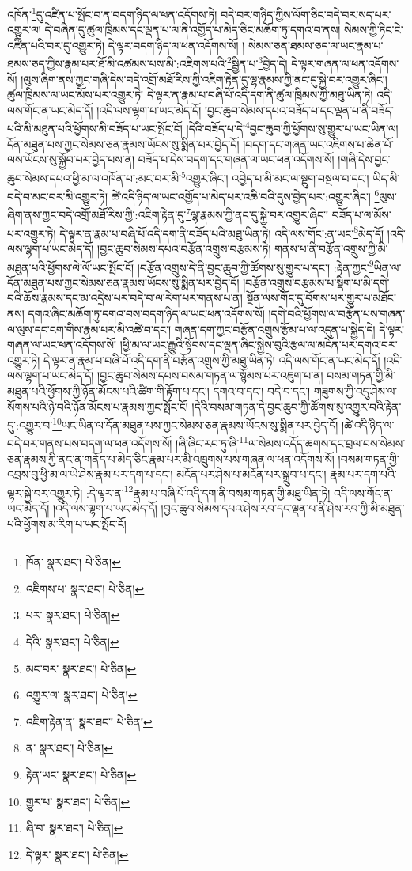 འཁོན་\footnote{ཁོན་  སྣར་ཐང་།  པེ་ཅིན། }དུ་འཛིན་པ་སྤོང་བ་ན་བདག་ཉིད་ལ་ཕན་འདོགས་ཏེ། བདེ་བར་གཉིད་ཀྱིས་ལོག་ཅིང་བདེ་བར་སད་པར་འགྱུར་ལ། དེ་བཞིན་དུ་ཚུལ་ཁྲིམས་དང་ལྡན་པ་ལ་ནི་འགྱོད་པ་མེད་ཅིང་མཆོག་ཏུ་དགའ་བ་ནས། སེམས་ཀྱི་ཏིང་ངེ་འཛིན་པའི་བར་དུ་འགྱུར་ཏེ། དེ་ལྟར་བདག་ཉིད་ལ་ཕན་འདོགས་སོ། །
སེམས་ཅན་ཐམས་ཅད་ལ་ཡང་རྣམ་པ་ཐམས་ཅད་ཀྱིས་རྣམ་པར་ཐོ་མི་འཚམས་པས་མི་:འཇིགས་པའི་\footnote{འཇིགས་པ་  སྣར་ཐང་།  པེ་ཅིན། }སྦྱིན་པ་\footnote{པར་  སྣར་ཐང་།  པེ་ཅིན། }བྱེད་དེ། དེ་ལྟར་གཞན་ལ་ཕན་འདོགས་སོ། །ལུས་ཞིག་ནས་ཀྱང་གཞི་དེས་བདེ་འགྲོ་མཐོ་རིས་ཀྱི་འཇིག་རྟེན་དུ་ལྷ་རྣམས་ཀྱི་ནང་དུ་སྐྱེ་བར་འགྱུར་ཞིང་། ཚུལ་ཁྲིམས་ལ་ཡང་མོས་པར་འགྱུར་ཏེ། དེ་ལྟར་ན་རྣམ་པ་བཞི་པོ་འདི་དག་ནི་ཚུལ་ཁྲིམས་ཀྱི་མཐུ་ཡིན་ཏེ། འདི་ལས་གོང་ན་ཡང་མེད་དོ། །འདི་ལས་ལྷག་པ་ཡང་མེད་དོ། །བྱང་ཆུབ་སེམས་དཔའ་བཟོད་པ་དང་ལྡན་པ་ནི་བཟོད་པའི་མི་མཐུན་པའི་ཕྱོགས་མི་བཟོད་པ་ཡང་སྤོང་ངོ། །དེའི་བཟོད་པ་དེ་\footnote{དེའི་  སྣར་ཐང་།  པེ་ཅིན། }བྱང་ཆུབ་ཀྱི་ཕྱོགས་སུ་གྱུར་པ་ཡང་ཡིན་ལ། དོན་མཐུན་པས་ཀྱང་སེམས་ཅན་རྣམས་ཡོངས་སུ་སྨིན་པར་བྱེད་དོ། །བདག་དང་གཞན་ཡང་འཇིགས་པ་ཆེན་པོ་ལས་ཡོངས་སུ་སྐྱོབ་པར་བྱེད་པས་ན། བཟོད་པ་དེས་བདག་དང་གཞན་ལ་ཡང་ཕན་འདོགས་སོ། །གཞི་དེས་བྱང་ཆུབ་སེམས་དཔའ་ཕྱི་མ་ལ་འཁོན་པ་:མང་བར་མི་\footnote{མང་བར་  སྣར་ཐང་།  པེ་ཅིན། }འགྱུར་ཞིང་། འབྱེད་པ་མི་མང་ལ་སྡུག་བསྔལ་བ་དང་། ཡིད་མི་བདེ་བ་མང་བར་མི་འགྱུར་ཏེ། ཚེ་འདི་ཉིད་ལ་ཡང་འགྱོད་པ་མེད་པར་འཆི་བའི་དུས་བྱེད་པར་:འགྱུར་ཞིང་། \footnote{འགྱུར་ལ་  སྣར་ཐང་།  པེ་ཅིན། }ལུས་ཞིག་ནས་ཀྱང་བདེ་འགྲོ་མཐོ་རིས་ཀྱི་:འཇིག་རྟེན་དུ་\footnote{འཇིག་རྟེན་ན་  སྣར་ཐང་།  པེ་ཅིན། }ལྷ་རྣམས་ཀྱི་ནང་དུ་སྐྱེ་བར་འགྱུར་ཞིང་། བཟོད་པ་ལ་མོས་པར་འགྱུར་ཏེ། དེ་ལྟར་ན་རྣམ་པ་བཞི་པོ་འདི་དག་ནི་བཟོད་པའི་མཐུ་ཡིན་ཏེ། འདི་ལས་གོང་:ན་ཡང་\footnote{ན་  སྣར་ཐང་།  པེ་ཅིན། }མེད་དོ། །འདི་ལས་ལྷག་པ་ཡང་མེད་དོ། །བྱང་ཆུབ་སེམས་དཔའ་བརྩོན་འགྲུས་བརྩམས་ཏེ། གནས་པ་ནི་བརྩོན་འགྲུས་ཀྱི་མི་མཐུན་པའི་ཕྱོགས་ལེ་ལོ་ཡང་སྤོང་ངོ། །བརྩོན་འགྲུས་དེ་ནི་བྱང་ཆུབ་ཀྱི་ཚོགས་སུ་གྱུར་པ་དང་། :རྟེན་ཀྱང་\footnote{རྟེན་ཡང་  སྣར་ཐང་།  པེ་ཅིན། }ཡིན་ལ་དོན་མཐུན་པས་ཀྱང་སེམས་ཅན་རྣམས་ཡོངས་སུ་སྨིན་པར་བྱེད་དོ། །བརྩོན་འགྲུས་བརྩམས་པ་སྡིག་པ་མི་དགེ་བའི་ཆོས་རྣམས་དང་མ་འདྲེས་པར་བདེ་བ་ལ་རེག་པར་གནས་པ་ན། སྔོན་ལས་གོང་དུ་བོགས་པར་གྱུར་པ་མཐོང་ནས། དགའ་ཞིང་མཆོག་ཏུ་དགའ་བས་བདག་ཉིད་ལ་ཡང་ཕན་འདོགས་སོ། །དགེ་བའི་ཕྱོགས་ལ་བརྩོན་པས་གཞན་ལ་ལུས་དང་ངག་གིས་རྣམ་པར་མི་འཚེ་བ་དང་། གཞན་དག་ཀྱང་བརྩོན་འགྲུས་རྩོམ་པ་ལ་འདུན་པ་སྐྱེད་དེ། དེ་ལྟར་གཞན་ལ་ཡང་ཕན་འདོགས་སོ། །ཕྱི་མ་ལ་ཡང་རྒྱུའི་སྟོབས་དང་ལྡན་ཞིང་སྐྱེས་བུའི་རྩལ་ལ་མངོན་པར་དགའ་བར་འགྱུར་ཏེ། དེ་ལྟར་ན་རྣམ་པ་བཞི་པོ་འདི་དག་ནི་བརྩོན་འགྲུས་ཀྱི་མཐུ་ཡིན་ཏེ། འདི་ལས་གོང་ན་ཡང་མེད་དོ། །འདི་ལས་ལྷག་པ་ཡང་མེད་དོ། །བྱང་ཆུབ་སེམས་དཔས་བསམ་གཏན་ལ་སྙོམས་པར་འཇུག་པ་ན། བསམ་གཏན་གྱི་མི་མཐུན་པའི་ཕྱོགས་ཀྱི་ཉོན་མོངས་པའི་ཚིག་གི་རྟོག་པ་དང་། དགའ་བ་དང་། བདེ་བ་དང་། གཟུགས་ཀྱི་འདུ་ཤེས་ལ་སོགས་པའི་ཉེ་བའི་ཉོན་མོངས་པ་རྣམས་ཀྱང་སྤོང་ངོ། །དེའི་བསམ་གཏན་དེ་བྱང་ཆུབ་ཀྱི་ཚོགས་སུ་འགྱུར་བའི་རྟེན་དུ་:འགྱུར་བ་\footnote{གྱུར་པ་  སྣར་ཐང་།  པེ་ཅིན། }ཡང་ཡིན་ལ་དོན་མཐུན་པས་ཀྱང་སེམས་ཅན་རྣམས་ཡོངས་སུ་སྨིན་པར་བྱེད་དོ། །ཚེ་འདི་ཉིད་ལ་བདེ་བར་གནས་པས་བདག་ལ་ཕན་འདོགས་སོ། །ཞི་ཞིང་རབ་ཏུ་ཞི་\footnote{ཞི་བ་  སྣར་ཐང་།  པེ་ཅིན། }ལ་སེམས་འདོད་ཆགས་དང་བྲལ་བས་སེམས་ཅན་རྣམས་ཀྱི་ནང་ན་གནོད་པ་མེད་ཅིང་རྣམ་པར་མི་འཁྲུགས་པས་གཞན་ལ་ཕན་འདོགས་སོ། །བསམ་གཏན་གྱི་འབྲས་བུ་ཕྱི་མ་ལ་ཡེ་ཤེས་རྣམ་པར་དག་པ་དང་། མངོན་པར་ཤེས་པ་མངོན་པར་སྒྲུབ་པ་དང་། རྣམ་པར་དག་པའི་ལྷར་སྐྱེ་བར་འགྱུར་ཏེ། :དེ་ལྟར་ན་\footnote{དེ་ལྟར་  སྣར་ཐང་།  པེ་ཅིན། }རྣམ་པ་བཞི་པོ་འདི་དག་ནི་བསམ་གཏན་གྱི་མཐུ་ཡིན་ཏེ། འདི་ལས་གོང་ན་ཡང་མེད་དོ། །འདི་ལས་ལྷག་པ་ཡང་མེད་དོ། །བྱང་ཆུབ་སེམས་དཔའ་ཤེས་རབ་དང་ལྡན་པ་ནི་ཤེས་རབ་ཀྱི་མི་མཐུན་པའི་ཕྱོགས་མ་རིག་པ་ཡང་སྤོང་ངོ། 